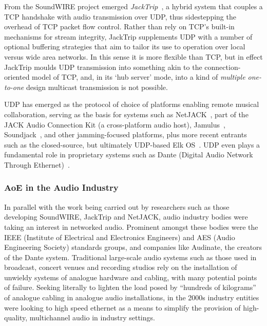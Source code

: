 From the SoundWIRE project emerged
\textit{JackTrip}~\citep{caceres_jacktrip_2010,caceras_jacktripsoundwire_2010},
a hybrid system that couples a TCP handshake with audio transmission over UDP,
thus sidestepping the overhead of TCP packet flow control.
Rather than rely on TCP's built-in mechanisms for stream integrity, JackTrip
supplements UDP with a number of optional buffering strategies that aim to
tailor its use to operation over local versus wide area networks.
In this sense it is more flexible than TCP, but in effect JackTrip moulds UDP
transmission into something akin to the connection-oriented model of TCP, and,
in its `hub server' mode, into a kind of \textit{multiple one-to-one} design
\textemdash{} multicast transmission is not possible.

UDP has emerged as the protocol of choice of platforms enabling remote musical
collaboration, serving as the basis for systems such as
NetJACK~\citep{carot_netjack_2009}, part of the JACK Audio Connection Kit (a
cross-platform audio host), Jamulus~\citep{fischer_case_2015},
Soundjack~\citep{renaud_networked_2012}, and other jamming-focused platforms,
plus more recent entrants such as the closed-source, but ultimately UDP-based
Elk OS~\citep{turchet_elk_2021}.
UDP even plays a fundamental role in proprietary systems such as Dante (Digital
Audio Network Through Ethernet)~\citep{noauthor_what_nodate}.

\subsubsection{AoE in the Audio Industry}

In parallel with the work being carried out by researchers such as those
developing SoundWIRE, JackTrip and NetJACK, audio industry bodies were taking
an interest in networked audio.
Prominent amongst these bodies were the IEEE (Institute of Electrical and
Electronics Engineers) and AES (Audio Engineering Society) standards groups,
and companies like Audinate, the creators of the Dante system.
Traditional large-scale audio systems such as those used in broadcast, concert
venues and recording studios rely on the installation of unwieldy systems of
analogue hardware and cabling, with many potential points of failure.
Seeking literally to lighten the load posed by ``hundreds of
kilograms''~\citep{bakker_introduction_2014} of analogue cabling in analogue
audio installations, in the 2000s industry entities were looking to high speed
ethernet as a means to simplify the provision of high-quality, multichannel
audio in industry settings.

